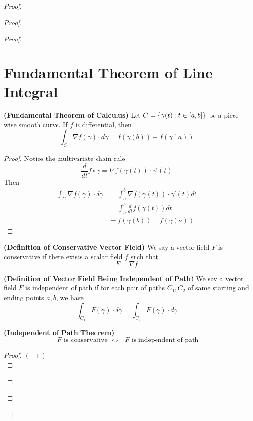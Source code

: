\documentclass{report}
\begin{document}
\begin{proof}
\begin{proof}
\begin{proof}
\section{Fundamental Theorem of Line Integral}
\begin{theorem}
\label{7.2.1}
\textbf{(Fundamental Theorem of Calculus)} Let $C=\{ \gamma (t):t\in [a,b] \}$ be a piece-wise smooth curve. If $f$ is differential, then
 \begin{equation}
\int_C \nabla f(\gamma )\cdot d\gamma =f(\gamma (b))-f(\gamma (a))
\end{equation}
\end{theorem}
\begin{proof}
Notice the multivariate chain rule
\begin{equation}
\frac{d}{dt} f\circ \gamma =\nabla f(\gamma (t)) \cdot \gamma '(t)
\end{equation}
Then
\begin{align}
\int_C \nabla f(\gamma )\cdot d\gamma &=\int_a^b \nabla f(\gamma (t))\cdot \gamma '(t)dt\\
&=\int_a^b \frac{d}{dt}f(\gamma (t))dt\\
&=f(\gamma (b))-f(\gamma (a))
\end{align}
\end{proof}
\begin{definition}
\label{7.2.2}
\textbf{(Definition of Conservative Vector Field)} We say a vector field $F$ is conservative if there exists  a scalar field  $f$ such that
 \begin{equation}
F=\nabla f
\end{equation}
\end{definition}
\begin{definition}
\label{7.2.3}
\textbf{(Definition of Vector Field Being Independent of Path)} We say a vector field $F$ is independent of path if for each pair of paths $C_1,C_2$ of same starting and ending points $a,b$, we have
\begin{equation}
\int_{C_1} F(\gamma )\cdot d\gamma =\int_{C_2}F(\gamma )\cdot d\gamma 
\end{equation}
\end{definition}
\begin{theorem}
\label{7.2.4}
\textbf{(Independent of Path Theorem)} 
\begin{equation}
\text{ $F$ is conservative }\iff \text{ $F$ is independent of path }
\end{equation}
\end{theorem}
\begin{proof}
$(\longrightarrow)$\\


\end{proof}
\end{proof}
\end{proof}
\end{proof}
\end{document}
